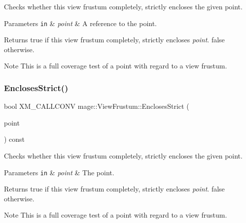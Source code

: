 Checks whether this view frustum completely, strictly encloses the given point.


\begin{DoxyParams}[1]{Parameters}
\mbox{\tt in}  & {\em point} & A reference to the point. \\
\hline
\end{DoxyParams}
\begin{DoxyReturn}{Returns}
{\ttfamily true} if this view frustum completely, strictly encloses {\itshape point}. {\ttfamily false} otherwise. 
\end{DoxyReturn}
\begin{DoxyNote}{Note}
This is a full coverage test of a point with regard to a view frustum. 
\end{DoxyNote}
\hypertarget{structmage_1_1_view_frustum_ace8e8e4a91b34280fabf0bc879534ad2}{}\label{structmage_1_1_view_frustum_ace8e8e4a91b34280fabf0bc879534ad2} 
\subsubsection{\texorpdfstring{Encloses\+Strict()}{EnclosesStrict()}\hspace{0.1cm}{\footnotesize\ttfamily [2/4]}}
{\footnotesize\ttfamily bool X\+M\+\_\+\+C\+A\+L\+L\+C\+O\+NV mage\+::\+View\+Frustum\+::\+Encloses\+Strict (\begin{DoxyParamCaption}\item[{F\+X\+M\+V\+E\+C\+T\+OR}]{point }\end{DoxyParamCaption}) const\hspace{0.3cm}{\ttfamily [noexcept]}}

Checks whether this view frustum completely, strictly encloses the given point.


\begin{DoxyParams}[1]{Parameters}
\mbox{\tt in}  & {\em point} & The point. \\
\hline
\end{DoxyParams}
\begin{DoxyReturn}{Returns}
{\ttfamily true} if this view frustum completely, strictly encloses {\itshape point}. {\ttfamily false} otherwise. 
\end{DoxyReturn}
\begin{DoxyNote}{Note}
This is a full coverage test of a point with regard to a view frustum. 
\end{DoxyNote}
\hypertarget{structmage_1_1_view_frustum_a7a0d293c4f3d1f29c54f45f00a7ca51f}{}\label{structmage_1_1_view_frustum_a7a0d293c4f3d1f29c54f45f00a7ca51f} 
